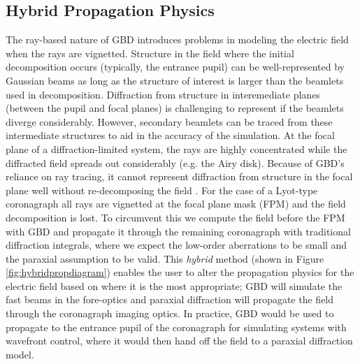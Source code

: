 \subsection{Hybrid Propagation Physics}
The ray-based nature of GBD introduces problems in modeling the electric field when the rays are vignetted. Structure in the field where the initial decomposition occurs (typically, the entrance pupil) can be well-represented by Gaussian beams as long as the structure of interest is larger than the beamlets used in decomposition. Diffraction from structure in interemediate planes (between the pupil and focal planes) is challenging to represent if the beamlets diverge considerably. However, secondary beamlets can be traced from these intermediate structures to aid in the accuracy of the simulation\cite{Greynolds14}. At the focal plane of a diffraction-limited system, the rays are highly concentrated while the diffracted field spreads out considerably (e.g. the Airy disk). Because of GBD's reliance on ray tracing, it cannot represent diffraction from structure in the focal plane well without re-decomposing the field \cite{modeling_coherence_fred}. For the case of a Lyot-type coronagraph all rays are vignetted at the focal plane mask (FPM) and the field decomposition is lost. To circumvent this we compute the field before the FPM with GBD and propagate it through the remaining coronagraph with traditional diffraction integrals, where we expect the low-order aberrations to be small and the paraxial assumption to be valid. This \emph{hybrid} method (shown in Figure \ref{fig:hybridpropdiagram}) enables the user to alter the propagation physics for the electric field based on where it is the most appropriate; GBD will simulate the fast beams in the fore-optics and paraxial diffraction will propagate the field through the coronagraph imaging optics. In practice, GBD would be used to propagate to the entrance pupil of the coronagraph for simulating systems with wavefront control, where it would then hand off the field to a paraxial diffraction model.

